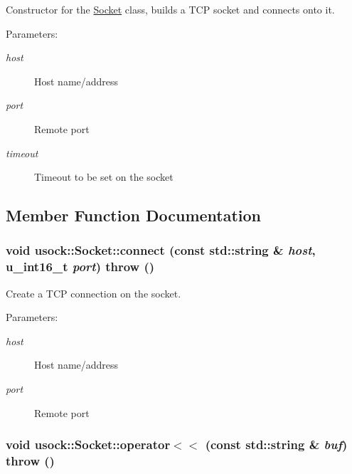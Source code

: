 Constructor for the \hyperlink{classusock_1_1Socket}{Socket} class, builds a TCP socket and connects onto it. 

\begin{Desc}
\item[Parameters:]
\begin{description}
\item[{\em host}]Host name/address \item[{\em port}]Remote port \item[{\em timeout}]Timeout to be set on the socket \end{description}
\end{Desc}


\subsection{Member Function Documentation}
\hypertarget{classusock_1_1Socket_2036f820d8973a3e4a7cd9c60d6a5a24}{
\subsubsection[{connect}]{\setlength{\rightskip}{0pt plus 5cm}void usock::Socket::connect (const std::string \& {\em host}, \/  u\_\-int16\_\-t {\em port})  throw ()}}
\label{classusock_1_1Socket_2036f820d8973a3e4a7cd9c60d6a5a24}


Create a TCP connection on the socket. 

\begin{Desc}
\item[Parameters:]
\begin{description}
\item[{\em host}]Host name/address \item[{\em port}]Remote port \end{description}
\end{Desc}
\hypertarget{classusock_1_1Socket_1887be63ebc540949cfadf18fa5d9532}{
\subsubsection[{operator$<$$<$}]{\setlength{\rightskip}{0pt plus 5cm}void usock::Socket::operator$<$$<$ (const std::string \& {\em buf})  throw ()}}
\label{classusock_1_1Socket_1887be63ebc540949cfadf18fa5d9532}


